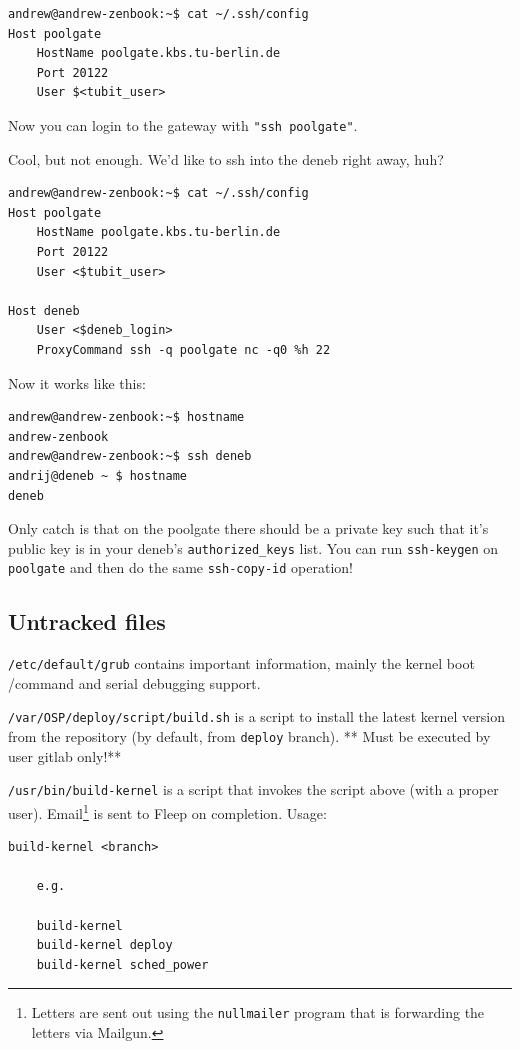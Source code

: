 \documentclass[]{report}
\begin{document}
\begin{lstlisting}[style=simple]
andrew@andrew-zenbook:~$ cat ~/.ssh/config
Host poolgate
    HostName poolgate.kbs.tu-berlin.de
    Port 20122
    User $<tubit_user>
\end{lstlisting}

Now you can login to the gateway with \lstinline!"ssh poolgate"!.

Cool, but not enough. We'd like to ssh into the deneb right away, huh?

\begin{lstlisting}[style=simple]
andrew@andrew-zenbook:~$ cat ~/.ssh/config
Host poolgate
    HostName poolgate.kbs.tu-berlin.de
    Port 20122
    User <$tubit_user>

Host deneb
    User <$deneb_login>
    ProxyCommand ssh -q poolgate nc -q0 %h 22 
\end{lstlisting}

Now it works like this:

\begin{lstlisting}[style=simple]
andrew@andrew-zenbook:~$ hostname
andrew-zenbook
andrew@andrew-zenbook:~$ ssh deneb
andrij@deneb ~ $ hostname
deneb
\end{lstlisting}

Only catch is that on the poolgate there should be a private key such
that it's public key is in your deneb's \lstinline!authorized_keys!
list. You can run \lstinline!ssh-keygen! on \lstinline!poolgate! and
then do the same \lstinline!ssh-copy-id! operation!

\subsection{Untracked files}\label{untracked-files}

\lstinline!/etc/default/grub! contains important information, mainly the
kernel boot /command and serial debugging support.

\lstinline!/var/OSP/deploy/script/build.sh! is a script to install the
latest kernel version from the repository (by default, from
\lstinline!deploy! branch). ** Must be executed by user gitlab only!**

\lstinline!/usr/bin/build-kernel! is a script that invokes the script
above (with a proper user). Email\footnote{Letters are sent out using
  the \lstinline!nullmailer! program that is forwarding the letters via
  Mailgun.} is sent to Fleep on completion. Usage:

\begin{lstlisting}[style=simple]
build-kernel <branch>

    e.g.

    build-kernel
    build-kernel deploy
    build-kernel sched_power
\end{lstlisting}
\end{document}
